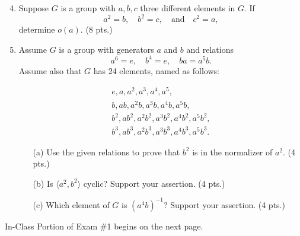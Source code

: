 \newpage
\begin{enumerate}
    \setcounter{enumi}{3} %
    \setlength{\itemsep}{15pt} %
    \item Suppose \( G \) is a group with \( a, b, c \) three different elements in \( G \). If 
    \[
    a^2 = b, \quad b^2 = c, \quad \text{and} \quad c^2 = a,
    \]
    determine \( o(a) \). \hfill (8 pts.)

    \item Assume \( G \) is a group with generators \( a \) and \( b \) and relations
    \[
    \boxed{a^6 = e, \quad b^4 = e, \quad ba = a^5 b.}
    \]
    Assume also that \( G \) has 24 elements, named as follows:
    
    \[
    \boxed{
        \begin{array}{l}
            e, a, a^2, a^3, a^4, a^5,  \\ 
            b, ab, a^2b, a^3b, a^4b, a^5b, \\ 
            b^2, a b^2, a^2 b^2, a^3 b^2, a^4 b^2, a^5 b^2, \\ 
            b^3, a b^3, a^2 b^3, a^3 b^3, a^4 b^3, a^5 b^3.
        \end{array}
        }
    \]

    \begin{enumerate}
        \setlength{\itemsep}{10pt} %
        \item[(a)] Use the given relations to prove that \( b^2 \) is in the normalizer of \( a^2 \). \hfill (4 pts.)
        
        \item[(b)] Is \( \langle a^2, b^2 \rangle \) cyclic? Support your assertion. \hfill (4 pts.)
        
        \item[(c)] Which element of \( G \) is \( (a^4 b)^{-1} \)? Support your assertion. \hfill (4 pts.)
    \end{enumerate}
\end{enumerate}
\vspace{0.25in}
\begin{tcolorbox}
    \begin{center}
        In-Class Portion of Exam \#1 begins on the next page.
    \end{center}
\end{tcolorbox}
\newpage

